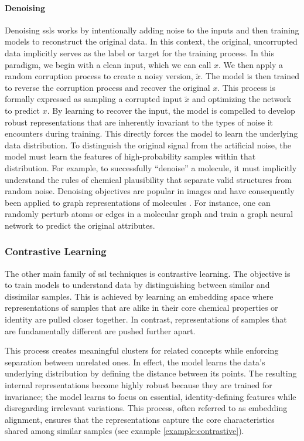 \paragraph{Denoising}
\label{sec:denoising}
Denoising \glspl{ssl} works by intentionally adding noise to the inputs and then training models to reconstruct the original data. 
In this context, the original, uncorrupted data implicitly serves as the label or target for the training process.  In this paradigm, we begin with a clean input, which we can call $x$. 
We then apply a random corruption process to create a noisy version, $\tilde{x}$. 
The model is then trained to reverse the corruption process and recover the original $x$. 
This process is formally expressed as sampling a corrupted input $\tilde{x}$ and optimizing the network to predict $x$. \autocite{vincent2010stacked}
By learning to recover the input, the model is compelled to develop robust representations that are inherently invariant to the types of noise it encounters during training.
This directly forces the model to learn the underlying data distribution.  
To distinguish the original signal from the artificial noise, the model must learn the features of high-probability samples within that distribution. 
For example, to successfully \enquote{denoise} a molecule, it must implicitly understand the rules of chemical plausibility that separate valid structures from random noise.  
Denoising objectives are popular in images \autocite{vincent2008extracting, bengio2013generalized} and have consequently been applied to graph representations of molecules \autocite{wang2023denoise, ni2024pre}. 
For instance, one can randomly perturb atoms or edges in a molecular graph and train a graph neural network to predict the original attributes. 

\subsubsection{Contrastive Learning}
\label{sec:contrastive_learning}
The other main family of \gls{ssl} techniques is contrastive learning. The objective is to train models to understand data by distinguishing between similar and dissimilar samples. 
This is achieved by learning an embedding space where representations of samples that are alike in their core chemical properties or identity are pulled closer together. 
In contrast, representations of samples that are fundamentally different are pushed further apart. \autocite{hadsell2006dimensionality}

This process creates meaningful clusters for related concepts while enforcing separation between unrelated ones. 
In effect, the model learns the data's underlying distribution by defining the distance between its points. 
The resulting internal representations become highly robust because they are trained for invariance; the model learns to focus on essential, identity-defining features while disregarding irrelevant variations. 
This process, often referred to as embedding alignment, ensures that the representations capture the core characteristics shared among similar samples (see example \ref{example:contrastive}).

